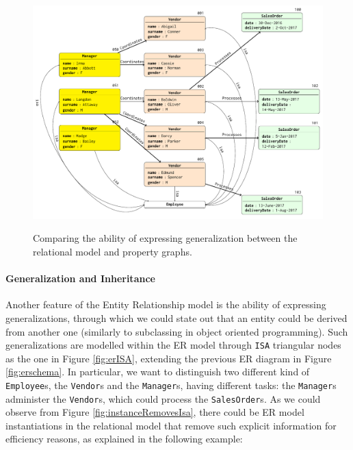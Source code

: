 \begin{figure}[!pth]
	\begin{minipage}[b]{\textwidth}
		\centering
		\includegraphics[scale=.6]{fig/02models/06graphWithRDF}
		\label{fig:graphofISAInstance}
	\end{minipage}
	\caption{Comparing the ability of expressing generalization between the relational model and property graphs. }
	\label{fig:relationalinstance}
\end{figure}

\paragraph*{Generalization and Inheritance}
Another feature of the Entity Relationship model is the ability of expressing generalizations, through which we could state out that an entity could be derived from another one (similarly to subclassing in object oriented programming). Such generalizations are modelled within the ER model through \texttt{ISA} triangular nodes as the one in Figure \vref{fig:erISA}, extending the previous ER diagram in Figure \ref{fig:erschema}. In particular, we want to distinguish two different kind of \texttt{Employee}s, the \texttt{Vendor}s and the \texttt{Manager}s, having different tasks: the \texttt{Manager}s administer the \texttt{Vendor}s, which could process the \texttt{SalesOrder}s. As we could observe from Figure \ref{fig:instanceRemovesIsa}, there could be ER model instantiations in the relational model that remove such explicit information for efficiency reasons, as explained in the following example:

